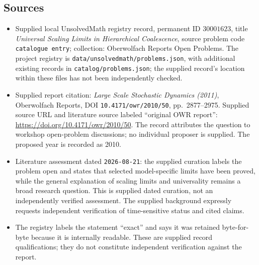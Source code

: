 \documentclass[11pt]{article}
\begin{document}
\subsection{Sources}
\begin{itemize}
\item Supplied local UnsolvedMath registry record, permanent ID \(30001623\), title \emph{Universal Scaling Limits in Hierarchical Coalescence}, source problem code \texttt{catalogue entry}; collection: Oberwolfach Reports Open Problems. The project registry is \texttt{data/unsolvedmath/problems.json}, with additional existing records in \texttt{catalog/problems.json}; the supplied record's location within these files has not been independently checked.
\item Supplied report citation: \emph{Large Scale Stochastic Dynamics (2011)}, Oberwolfach Reports, DOI \texttt{10.4171/owr/2010/50}, pp.\ 2877--2975. Supplied source URL and literature source labeled ``original OWR report'': \url{https://doi.org/10.4171/owr/2010/50}. The record attributes the question to workshop open-problem discussions; no individual proposer is supplied. The proposed year is recorded as 2010.
\item Literature assessment dated \texttt{2026-08-21}: the supplied curation labels the problem open and states that selected model-specific limits have been proved, while the general explanation of scaling limits and universality remains a broad research question. This is supplied dated curation, not an independently verified assessment. The supplied background expressly requests independent verification of time-sensitive status and cited claims.
\item The registry labels the statement ``exact'' and says it was retained byte-for-byte because it is internally readable. These are supplied record qualifications; they do not constitute independent verification against the report.
\end{itemize}
\end{document}
